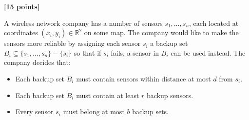 \documentclass{assignment-373}
\begin{document}
\think


\textbf{[15 points]}

A wireless network company has a number of sensors $s_1, \dots, s_n$, each located at coordinates $(x_i, y_i) \in \mathbb{R}^2$ on some map. The company would like to make the sensors more reliable by assigning each sensor $s_i$ a backup set $B_i \subseteq \{s_1, \dots, s_n\} - \{s_i\}$ so that if $s_i$ fails, a sensor in $B_i$ can be used instead. The company decides that:

\begin{itemize}
    \item Each backup set $B_i$ must contain sensors within distance at most $d$ from $s_i.$
    \item Each backup set $B_i$ must contain at least $r$ backup sensors.
    \item Every sensor $s_i$ must belong at most $b$ backup sets. 
\end{itemize}
\end{document}
